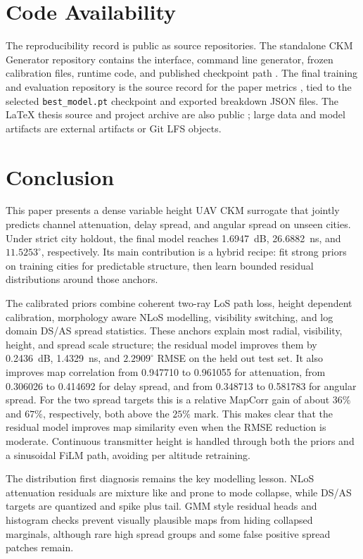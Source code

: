 \documentclass[journal]{IEEEtran}
\begin{document}
\section{Code Availability}

The reproducibility record is public as source repositories. The standalone CKM
Generator repository contains the interface, command line generator, frozen
calibration files, runtime code, and published checkpoint path
\cite{moreno2026ckmgenerator}. The final training and evaluation repository is
the source record for the paper metrics \cite{moreno2026finalcode}, tied to the
selected \texttt{best\_model.pt} checkpoint and exported breakdown JSON files.
The LaTeX thesis source and project archive are also public
\cite{moreno2026tfgprogress,moreno2026tfgtext}; large data and model artifacts
are external artifacts or Git LFS objects.

\section{Conclusion}

This paper presents a dense variable height UAV CKM surrogate that jointly
predicts channel attenuation, delay spread, and angular spread on unseen cities.
Under strict city holdout, the final model reaches \SI{1.6947}{dB},
\SI{26.6882}{ns}, and \(11.5253^\circ\), respectively. Its main contribution is
a hybrid recipe: fit strong priors on training cities for predictable structure,
then learn bounded residual distributions around those anchors.

The calibrated priors combine coherent two-ray LoS path loss, height dependent
calibration, morphology aware NLoS modelling, visibility switching, and log
domain DS/AS spread statistics. These anchors explain most radial, visibility,
height, and spread scale structure; the residual model improves them by
\SI{0.2436}{dB}, \SI{1.4329}{ns}, and \(2.2909^\circ\) RMSE on the held out
test set. It also improves map correlation from 0.947710 to 0.961055 for
attenuation, from 0.306026 to 0.414692 for delay spread, and from 0.348713 to
0.581783 for angular spread. For the two spread targets this is a relative
MapCorr gain of about \(36\%\) and \(67\%\), respectively, both above the
\(25\%\) mark. This makes clear that the residual model improves map similarity
even when the RMSE reduction is moderate. Continuous transmitter height is
handled through both the priors and a
sinusoidal FiLM path, avoiding per altitude retraining.

The distribution first diagnosis remains the key modelling lesson. NLoS
attenuation residuals are mixture like and prone to mode collapse, while DS/AS
targets are quantized and spike plus tail. GMM style residual heads and
histogram checks prevent visually plausible maps from hiding collapsed
marginals, although rare high spread groups and some false positive spread
patches remain.
\end{document}
